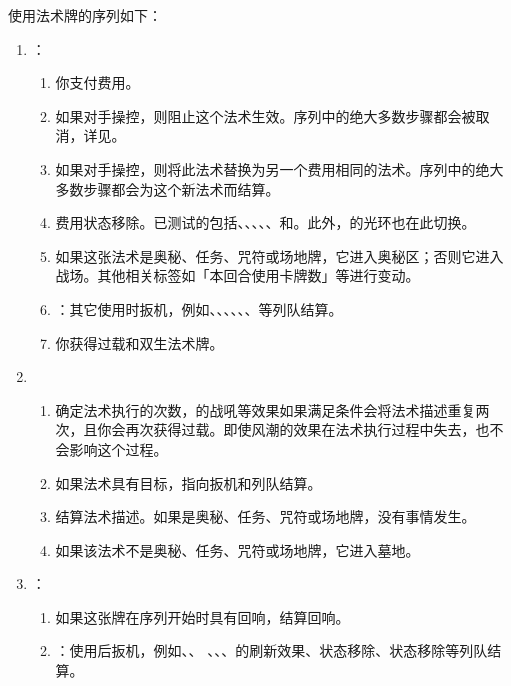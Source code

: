 使用法术牌的序列如下：
\begin{enumerate}
    \item {}：
    \begin{enumerate}
        \item 你支付费用。
        \item 如果对手操控，则阻止这个法术生效。序列中的绝大多数步骤都会被取消，详见。
        \item 如果对手操控，则将此法术替换为另一个费用相同的法术。序列中的绝大多数步骤都会为这个新法术而结算。
        \item 费用状态移除。已测试的包括、、、、、和。此外，的光环也在此切换。
        \item 如果这张法术是奥秘、任务、咒符或场地牌，它进入奥秘区；否则它进入战场。其他相关标签如「本回合使用卡牌数」等进行变动。
        \item {}：其它使用时扳机，例如、、、、、、等列队结算。
        \item 你获得过载和双生法术牌。
    \end{enumerate}

    \item {}
    \begin{enumerate}
        \item 确定法术执行的次数，的战吼等效果如果满足条件会将法术描述重复两次，且你会再次获得过载。即使风潮的效果在法术执行过程中失去，也不会影响这个过程。
        \item 如果法术具有目标，指向扳机和列队结算。
        \item 结算法术描述。如果是奥秘、任务、咒符或场地牌，没有事情发生。
        \item 如果该法术不是奥秘、任务、咒符或场地牌，它进入墓地。
    \end{enumerate}

    \item {}：
    \begin{enumerate}
        \item 如果这张牌在序列开始时具有回响，结算回响。
        \item {}：使用后扳机，例如、、 、、、的刷新效果、状态移除、状态移除等列队结算。
    \end{enumerate}
\end{enumerate}

